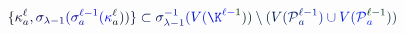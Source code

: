 \documentclass[12pt]{article}
\begin{document}
\makeatletter
\renewcommand*{\@textcolor}[3]{%
  \protect\leavevmode
  \begingroup
    \color#1{#2}#3%
  \endgroup
}
\makeatother
\begin{displaymath}
\mathcolor[RGB]{0,0,15}{\{} \mathcolor[RGB]{0,0,30}{\kappa} _ { \mathcolor[RGB]{0,0,45}{a} } ^ { \mathcolor[RGB]{0,0,60}{\ell} } \mathcolor[RGB]{0,0,75}{,} \mathcolor[RGB]{0,0,90}{\sigma} _ { \mathcolor[RGB]{0,0,105}{\lambda} \mathcolor[RGB]{0,0,120}{-} \mathcolor[RGB]{0,0,135}{1} } \mathcolor[RGB]{0,0,150}{(} \mathcolor[RGB]{0,0,165}{\sigma} _ { \mathcolor[RGB]{0,0,180}{a} } ^ { \mathcolor[RGB]{0,0,195}{\ell} \mathcolor[RGB]{0,0,210}{-} \mathcolor[RGB]{0,0,225}{1} } \mathcolor[RGB]{0,0,240}{(} \mathcolor[RGB]{0,0,255}{\kappa} _ { \mathcolor[RGB]{0,15,0}{a} } ^ { \mathcolor[RGB]{0,15,15}{\ell} } \mathcolor[RGB]{0,15,30}{)} \mathcolor[RGB]{0,15,45}{)} \mathcolor[RGB]{0,15,60}{\}} \mathcolor[RGB]{0,15,75}{\subset} \mathcolor[RGB]{0,15,90}{\sigma} _ { \mathcolor[RGB]{0,15,105}{\lambda} \mathcolor[RGB]{0,15,120}{-} \mathcolor[RGB]{0,15,135}{1} } ^ { \mathcolor[RGB]{0,15,150}{-} \mathcolor[RGB]{0,15,165}{1} } \mathcolor[RGB]{0,15,180}{(} \mathcolor[RGB]{0,15,195}{V} \mathcolor[RGB]{0,15,210}{(} \mathcolor[RGB]{0,15,225}{\K} ^ { \mathcolor[RGB]{0,15,240}{\ell} \mathcolor[RGB]{0,15,255}{-} \mathcolor[RGB]{0,30,0}{1} } \mathcolor[RGB]{0,30,15}{)} \mathcolor[RGB]{0,30,30}{)} \mathcolor[RGB]{0,30,45}{\setminus} \mathcolor[RGB]{0,30,60}{(} \mathcolor[RGB]{0,30,75}{V} \mathcolor[RGB]{0,30,90}{(} \mathcal { \mathcolor[RGB]{0,30,105}{P} } _ { \mathcolor[RGB]{0,30,120}{a} } ^ { \mathcolor[RGB]{0,30,135}{\ell} \mathcolor[RGB]{0,30,150}{-} \mathcolor[RGB]{0,30,165}{1} } \mathcolor[RGB]{0,30,180}{)} \mathcolor[RGB]{0,30,195}{\cup} \mathcolor[RGB]{0,30,210}{V} \mathcolor[RGB]{0,30,225}{(} \mathcal { \mathcolor[RGB]{0,30,240}{P} } _ { \mathcolor[RGB]{0,30,255}{a} } ^ { \mathcolor[RGB]{0,45,0}{\ell} \mathcolor[RGB]{0,45,15}{-} \mathcolor[RGB]{0,45,30}{1} } \mathcolor[RGB]{0,45,45}{)} \mathcolor[RGB]{0,45,60}{)}
\end{displaymath}
\end{document}
